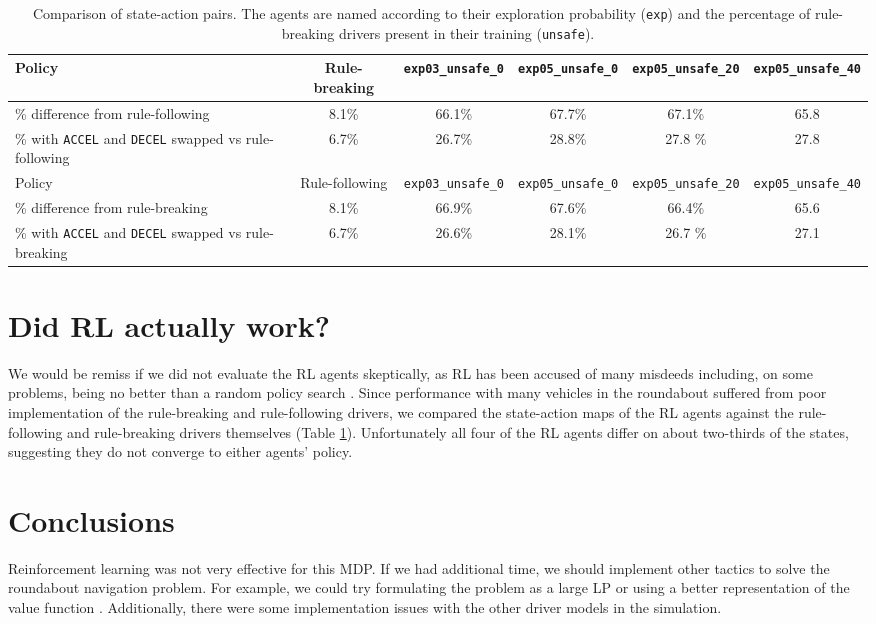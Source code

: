 \documentclass[conference]{IEEEtran}
\begin{document}
\clearpage

\begin{table}
	\begin{minipage}{\textwidth}
		\centering
		\begin{tabular}{|p{8em}|ccccc|}\hline
		Policy & Rule-breaking & \verb|exp03_unsafe_0| & \verb|exp05_unsafe_0| &  \verb|exp05_unsafe_20| &  \verb|exp05_unsafe_40| 
		\\\hline
		\% difference from rule-following & 8.1\% & 66.1\% & 67.7\% &67.1\% & 65.8
		\\
		\% with \verb|ACCEL| and \verb|DECEL| swapped vs rule-following & 6.7\% &
		26.7\% & 28.8\% &27.8 \% & 27.8
			\\\hline
		Policy & Rule-following & \verb|exp03_unsafe_0| & \verb|exp05_unsafe_0| &  \verb|exp05_unsafe_20| &  \verb|exp05_unsafe_40| 
		\\\hline
		\% difference from rule-breaking & 8.1\% & 66.9\% & 67.6\% &66.4\% &
		65.6
	\\
		\% with \verb|ACCEL| and \verb|DECEL| swapped vs rule-breaking & 6.7\% &
26.6\% & 28.1\% &26.7 \% & 27.1
\\\hline
		\end{tabular}
		\caption{Comparison of state-action pairs. The agents are named according to their exploration probability (\texttt{exp}) and the percentage of rule-breaking drivers present in their training (\texttt{unsafe}).}
		\label{tab:comparison}
	\end{minipage}
\end{table}

\section{Did RL actually work?} We would be remiss if we did not evaluate the RL agents skeptically, as RL has been accused of many misdeeds including, on some problems, being no better than a random policy search \cite{mania2018simple}.
Since performance with many vehicles in the roundabout suffered from poor implementation of the rule-breaking and rule-following drivers, we compared the state-action maps of the RL agents against the rule-following and rule-breaking drivers themselves (Table \ref{tab:comparison}). Unfortunately all four of the RL agents differ on about two-thirds of the states, suggesting they do not converge to either agents' policy.


\section*{Conclusions}
Reinforcement learning was not very effective for this MDP. If we had additional time, we should implement other tactics to solve the roundabout navigation problem. For example, we could try formulating the problem as a large LP or using a better representation of the value function \cite{kochenderfer2022algorithmsch7}. Additionally, there were some implementation issues with the other driver models in the simulation.
\end{document}
